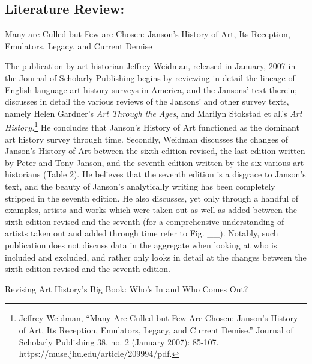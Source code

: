 \documentclass[
  letterpaper,
  DIV=11,
  numbers=noendperiod]{scrreprt}
\begin{document}
\hypertarget{literature-review}{%
\subsection{\texorpdfstring{\textbf{Literature
Review:}}{Literature Review:}}\label{literature-review}}

Many are Culled but Few are Chosen: Janson's History of Art, Its
Reception, Emulators, Legacy, and Current Demise

The publication by art historian Jeffrey Weidman, released in January,
2007 in the Journal of Scholarly Publishing begins by reviewing in
detail the lineage of English-language art history surveys in America,
and the Jansons' text therein; discusses in detail the various reviews
of the Jansons' and other survey texts, namely Helen Gardner's \emph{Art
Through the Ages}, and Marilyn Stokstad et al.'s \emph{Art
History.}\footnote{Jeffrey Weidman, ``Many Are Culled but Few Are
  Chosen: Janson's History of Art, Its Reception, Emulators, Legacy, and
  Current Demise.'' Journal of Scholarly Publishing 38, no. 2 (January
  2007): 85-107. https://muse.jhu.edu/article/209994/pdf.} He concludes
that Janson's History of Art functioned as the dominant art history
survey through time. Secondly, Weidman discusses the changes of Janson's
History of Art between the sixth edition revised, the last edition
written by Peter and Tony Janson, and the seventh edition written by the
six various art historians (Table 2). He believes that the seventh
edition is a disgrace to Janson's text, and the beauty of Janson's
analytically writing has been completely stripped in the seventh
edition. He also discusses, yet only through a handful of examples,
artists and works which were taken out as well as added between the
sixth edition revised and the seventh (for a comprehensive understanding
of artists taken out and added through time refer to Fig. \_\_).
Notably, such publication does not discuss data in the aggregate when
looking at who is included and excluded, and rather only looks in detail
at the changes between the sixth edition revised and the seventh
edition.

Revising Art History's Big Book: Who's In and Who Comes Out?
\end{document}
